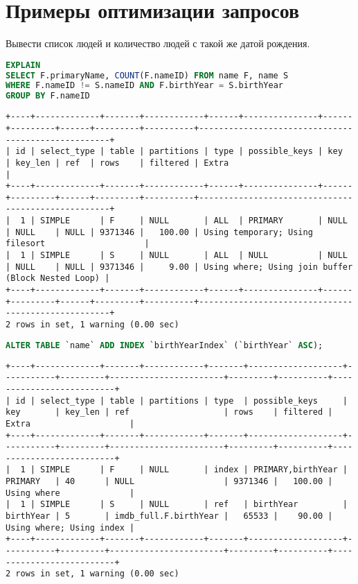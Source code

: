 \documentclass[12pt,a4paper]{article}
\begin{document}
\section{Примеры оптимизации запросов}
Вывести список людей и количество людей с такой же датой рождения.

\begin{lstlisting}[language=SQL]
EXPLAIN
SELECT F.primaryName, COUNT(F.nameID) FROM name F, name S
WHERE F.nameID != S.nameID AND F.birthYear = S.birthYear
GROUP BY F.nameID
\end{lstlisting}
\begin{lstlisting}[basicstyle = \tiny\ttfamily, columns = fixed]
+----+-------------+-------+------------+------+---------------+------+---------+------+---------+----------+----------------------------------------------------+
| id | select_type | table | partitions | type | possible_keys | key  | key_len | ref  | rows    | filtered | Extra                                              |
+----+-------------+-------+------------+------+---------------+------+---------+------+---------+----------+----------------------------------------------------+
|  1 | SIMPLE      | F     | NULL       | ALL  | PRIMARY       | NULL | NULL    | NULL | 9371346 |   100.00 | Using temporary; Using filesort                    |
|  1 | SIMPLE      | S     | NULL       | ALL  | NULL          | NULL | NULL    | NULL | 9371346 |     9.00 | Using where; Using join buffer (Block Nested Loop) |
+----+-------------+-------+------------+------+---------------+------+---------+------+---------+----------+----------------------------------------------------+
2 rows in set, 1 warning (0.00 sec)
\end{lstlisting}
\begin{lstlisting}[language=SQL]
ALTER TABLE `name` ADD INDEX `birthYearIndex` (`birthYear` ASC);
\end{lstlisting}
\begin{lstlisting}[basicstyle = \tiny\ttfamily, columns = fixed]
+----+-------------+-------+------------+-------+-------------------+-----------+---------+-----------------------+---------+----------+--------------------------+
| id | select_type | table | partitions | type  | possible_keys     | key       | key_len | ref                   | rows    | filtered | Extra                    |
+----+-------------+-------+------------+-------+-------------------+-----------+---------+-----------------------+---------+----------+--------------------------+
|  1 | SIMPLE      | F     | NULL       | index | PRIMARY,birthYear | PRIMARY   | 40      | NULL                  | 9371346 |   100.00 | Using where              |
|  1 | SIMPLE      | S     | NULL       | ref   | birthYear         | birthYear | 5       | imdb_full.F.birthYear |   65533 |    90.00 | Using where; Using index |
+----+-------------+-------+------------+-------+-------------------+-----------+---------+-----------------------+---------+----------+--------------------------+
2 rows in set, 1 warning (0.00 sec)
\end{lstlisting}
\end{document}
